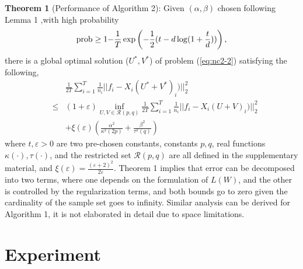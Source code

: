 \documentclass[twoside,leqno,twocolumn]{article}
\begin{document}
\noindent \textbf{Theorem 1} (Performance of Algorithm 2): Given $(\alpha, \beta)$ chosen following Lemma 1 ,with high probability
\begin{equation}
{\rm {prob}}\ge{\rm {1-}}\frac{1}{T}\exp\left({-\frac{1}{2}(t-d\log(1+\frac{t}{d}))}\right),
\end{equation}
there is a global optimal solution ($U^*, V^*$) of problem (\ref{eq:nc2-2}) satisfying the following,
\begin{eqnarray}
&&  \frac{1}{{2T}}\sum\limits_{i = 1}^T {\frac{1}{{{n_i}}}||{f_i} - {X_i}{{(U^* + V^*)}_i})||_2^2} \\
\nonumber
&\le& (1 + \varepsilon )\mathop {\inf }\limits_{U,V \in \mathcal{R}( p,q) }  \frac{1}{{2T}}\sum\limits_{i = 1}^T {\frac{1}{{{n_i}}}||{f_i} - {X_i}{{(U + V)}_i})||_2^2} \\
\nonumber
&& { + \xi (\varepsilon )\left( {\frac{{{\alpha ^2}}}{{{\kappa^2}(2p)}} + \frac{{{\beta ^2}}}{{{\tau^2}(q)}}} \right)}
\end{eqnarray}
%
where $t, \varepsilon >0$ are two pre-chosen constants,  constants $p,q$, real functions $\kappa(\cdot), \tau(\cdot)$,  and the restricted set $\mathcal{R}( p,q)$ are all defined in the supplementary material, and $\xi (\varepsilon ) = \frac{{{{(\varepsilon  + 2)}^2}}}{{2\varepsilon }}$. Theorem 1 implies that  error can be decomposed into two terms, where one depends on the formulation of $L(W)$, and the other is controlled by the regularization terms, and both bounds go to zero given the cardinality of the sample set goes to infinity.
Similar analysis can be derived for Algorithm 1, it is not elaborated in detail due to space limitations.


\section{Experiment}
\end{document}
